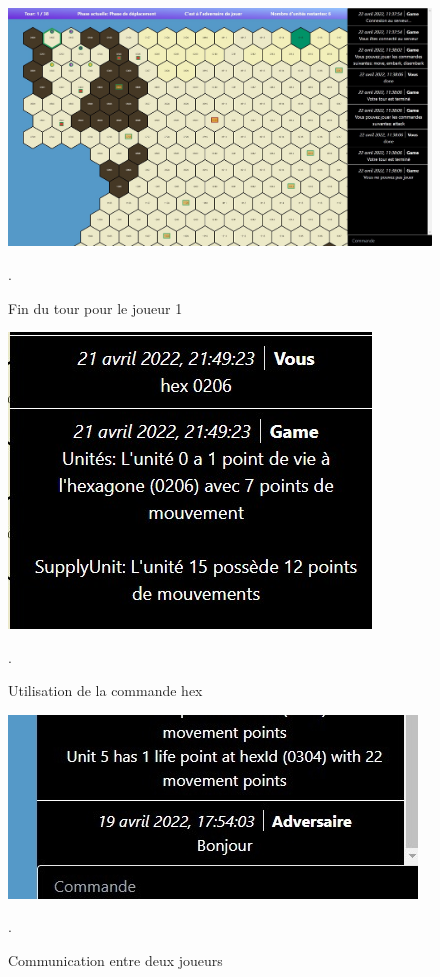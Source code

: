 \begin{figure}[H]
    \centering
    \includegraphics[scale=0.35]{data/fin_tour.jpg}
    \caption{Fin du tour pour le joueur 1}.
    \label{fig:fin_tour}
\end{figure}


\begin{figure}[H]
    \centering
    \includegraphics[scale=0.75]{data/hex_command.jpg}
    \caption{Utilisation de la commande hex}.
    \label{fig:hex_command}
\end{figure}

\begin{figure}[H]
    \centering
    \includegraphics[scale=0.6]{data/chat.jpg}
    \caption{Communication entre deux joueurs}.
    \label{fig:message_command}
\end{figure}

